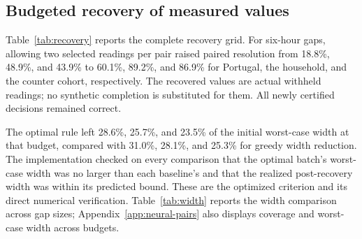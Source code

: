 \documentclass[12pt]{article}
\begin{document}
\FloatBarrier

\subsection{Budgeted recovery of measured values}\label{app:restricted-recovery}
Table~\ref{tab:recovery} reports the complete recovery grid. For six-hour
gaps, allowing two selected readings per pair raised paired resolution
from 18.8\%, 48.9\%, and 43.9\% to
60.1\%, 89.2\%, and 86.9\% for Portugal,
the household, and the counter cohort, respectively. The recovered values
are actual withheld readings; no synthetic completion is substituted for
them. All newly certified decisions remained correct.

The optimal rule left 28.6\%, 25.7\%, and 23.5\% of
the initial worst-case width at that budget, compared with
31.0\%, 28.1\%, and 25.3\% for greedy width
reduction. The implementation checked on every comparison that the
optimal batch's worst-case width was no larger than each baseline's and
that the realized post-recovery width was within its predicted bound.
These are the optimized criterion and its direct numerical verification.
Table~\ref{tab:width} reports the width comparison across gap sizes;
Appendix~\ref{app:neural-pairs} also displays coverage and worst-case width across budgets.
\end{document}
